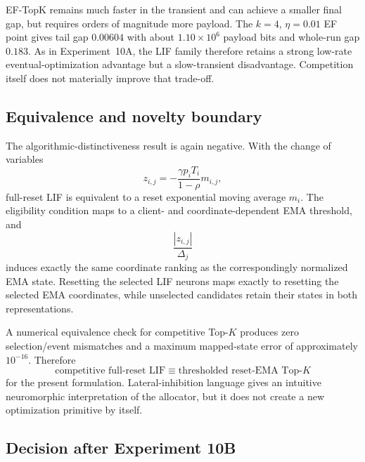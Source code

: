 EF-TopK remains much faster in the transient and can achieve a smaller final gap, but requires orders of magnitude more payload. The $k=4$, $\eta=0.01$ EF point gives tail gap $0.00604$ with about $1.10\times10^6$ payload bits and whole-run gap $0.183$. As in Experiment~10A, the LIF family therefore retains a strong low-rate eventual-optimization advantage but a slow-transient disadvantage. Competition itself does not materially improve that trade-off.

\subsection{Equivalence and novelty boundary}

The algorithmic-distinctiveness result is again negative. With the change of variables
\begin{equation}
  z_{i,j}=-\frac{\gamma p_iT_i}{1-\rho}m_{i,j},
\end{equation}
full-reset LIF is equivalent to a reset exponential moving average $m_i$. The eligibility condition maps to a client- and coordinate-dependent EMA threshold, and
\begin{equation}
  \frac{|z_{i,j}|}{\Delta_j}
\end{equation}
induces exactly the same coordinate ranking as the correspondingly normalized EMA state. Resetting the selected LIF neurons maps exactly to resetting the selected EMA coordinates, while unselected candidates retain their states in both representations.

A numerical equivalence check for competitive Top-$K$ produces zero selection/event mismatches and a maximum mapped-state error of approximately $10^{-16}$. Therefore
\begin{equation}
  \boxed{\text{competitive full-reset LIF}\equiv\text{thresholded reset-EMA Top-$K$}}
\end{equation}
for the present formulation. Lateral-inhibition language gives an intuitive neuromorphic interpretation of the allocator, but it does not create a new optimization primitive by itself.

\subsection{Decision after Experiment 10B}

